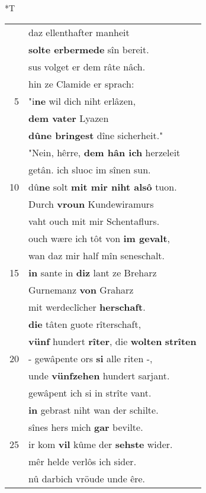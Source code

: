 \documentclass[8pt,a4paper,notitlepage]{article}
\begin{document}
\begin{table}[ht]
\begin{minipage}[t]{0.5\linewidth}
\end{minipage}
\hspace{0.5cm}
\begin{minipage}[t]{0.5\linewidth}
\small
\begin{center}*T
\end{center}
\begin{tabular}{rl}
 & daz ellenthafter manheit\\ 
 & \textbf{solte erbermede} sîn bereit.\\ 
 & sus volget er dem râte nâch.\\ 
 & hin ze Clamide er sprach:\\ 
5 & "i\textbf{ne} wil dich niht erlâzen,\\ 
 & \textbf{dem vater} Lyazen\\ 
 & \textbf{dûne bringest} dîne sicherheit."\\ 
 & "Nein, hêrre, \textbf{dem hân ich} herzeleit\\ 
 & getân. ich sluoc im sînen sun.\\ 
10 & dû\textbf{ne} solt \textbf{mit mir niht alsô} tuon.\\ 
 & Durch \textbf{vroun} Kundewiramurs\\ 
 & vaht ouch mit mir Schentaflurs.\\ 
 & ouch wære ich tôt von \textbf{im gevalt},\\ 
 & wan daz mir half mîn seneschalt.\\ 
15 & \textbf{in} sante in \textbf{diz} lant ze Breharz\\ 
 & Gurnemanz \textbf{von} Graharz\\ 
 & mit werdeclîcher \textbf{herschaft}.\\ 
 & \textbf{die} tâten guote rîterschaft,\\ 
 & \textbf{vünf} hundert \textbf{rîter}, die \textbf{wolten} \textbf{strîten}\\ 
20 & - gewâpente ors \textbf{si} alle riten -,\\ 
 & unde \textbf{vünfzehen} hundert sarjant.\\ 
 & gewâpent ich si in strîte vant.\\ 
 & \textbf{in} gebrast niht wan der schilte.\\ 
 & sînes hers mich \textbf{gar} bevilte.\\ 
25 & ir kom \textbf{vil} kûme der \textbf{sehste} wider.\\ 
 & mêr helde verlôs ich sider.\\ 
 & nû darbich vröude unde êre.\\ 

\end{tabular}
\end{minipage}
\end{table}
\end{document}
